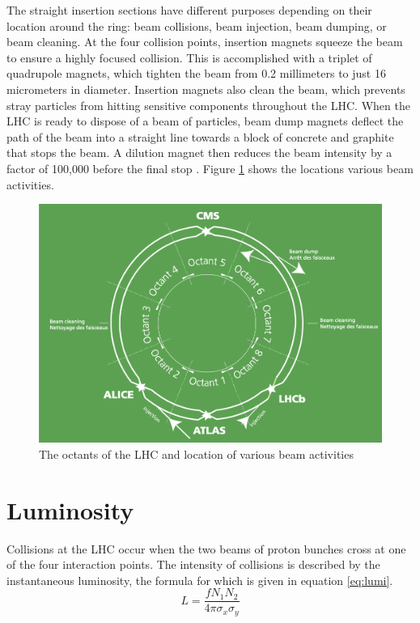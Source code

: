 The straight insertion sections have different purposes depending on their location around the ring: beam collisions, beam injection, beam dumping, or beam cleaning. At the four collision points, insertion magnets squeeze the beam to ensure a highly focused collision. This is accomplished with a triplet of quadrupole magnets, which tighten the beam from 0.2 millimeters to just 16 micrometers in diameter. Insertion magnets also clean the beam, which prevents stray particles from hitting sensitive components throughout the LHC. When the LHC is ready to dispose of a beam of particles, beam dump magnets deflect the path of the beam into a straight line towards a block of concrete and graphite that stops the beam. A dilution magnet then reduces the beam intensity by a factor of 100,000 before the final stop \cite{lhc_magnets}. Figure \ref{fig:lhc_octants} shows the locations various beam activities.

\begin{figure}
        \centering
	\includegraphics[width=.7\textwidth]{figures/ch2/lhc_octants.png}
	\caption{The octants of the LHC and location of various beam activities \cite{lhc_faq}}
	\label{fig:lhc_octants}
\end{figure} 
 
 \section{Luminosity}
 
Collisions at the LHC occur when the two beams of proton bunches cross at one of the four interaction points. The intensity of collisions is described by the instantaneous luminosity, the formula for which is given in equation \ref{eq:lumi}.  
 \begin{equation}
	L = \frac{f N_1 N_2}{4 \pi \sigma_x \sigma_y}
	\label{eq:lumi}
\end{equation}

